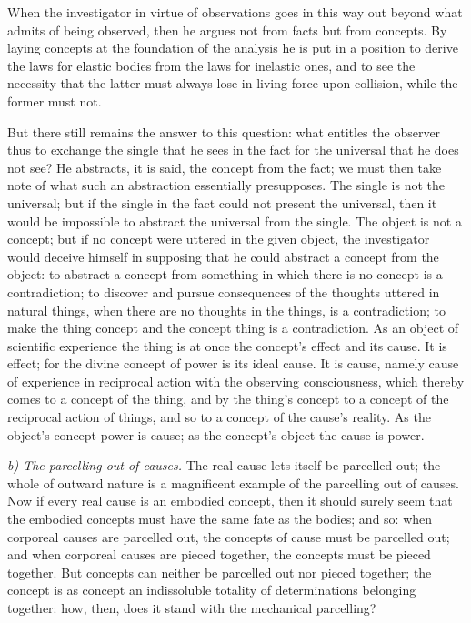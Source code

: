 \documentclass[12pt,a4paper]{book}
\newcommand{\runin}[1]{\emph{#1}\hspace{0.4em}}
\begin{document}
When the investigator in virtue of observations goes in this way out beyond what admits of being
observed, then he argues not from facts but from concepts. By laying concepts at the foundation
of the analysis he is put in a position to derive the laws for elastic bodies from the laws for
inelastic ones, and to see the necessity that the latter must always lose in living force upon
collision, while the former must not.

But there still remains the answer to this question: what entitles the observer thus to exchange
the single that he sees in the fact for the universal that he does not see? He abstracts, it is
said, the concept from the fact; we must then take note of what such an abstraction essentially
presupposes. The single is not the universal; but if the single in the fact could not present
the universal, then it would be impossible to abstract the universal from the single. The object
is not a concept; but if no concept were uttered in the given object, the investigator would
deceive himself in supposing that he could abstract a concept from the object: to abstract a
concept from something in which there is no concept is a contradiction; to discover and pursue
consequences of the thoughts uttered in natural things, when there are no thoughts in the
things, is a contradiction; to make the thing concept and the concept thing is a contradiction.
As an object of scientific experience the thing is at once the concept's effect and its cause.
It is effect; for the divine concept of power is its ideal cause. It is
cause, namely cause of experience in reciprocal action with the observing consciousness, which
thereby comes to a concept of the thing, and by the thing's concept to a concept of the
reciprocal action of things, and so to a concept of the cause's reality. As the object's concept
power is cause; as the concept's object the cause is power.

\runin{b) The parcelling out of causes.} The real cause lets itself be parcelled out; the whole
of outward nature is a magnificent example of the parcelling out of causes. Now if every real
cause is an embodied concept, then it should surely seem that the embodied concepts must have
the same fate as the bodies; and so: when corporeal causes are parcelled out, the concepts of
cause must be parcelled out; and when corporeal causes are pieced together, the concepts must be
pieced together. But concepts can neither be parcelled out nor pieced together; the concept is as
concept an indissoluble totality of determinations belonging together: how, then, does it stand
with the mechanical parcelling?
\end{document}
